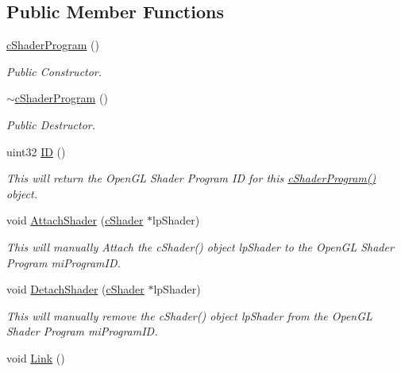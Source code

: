 \subsection*{Public Member Functions}
\begin{DoxyCompactItemize}
\item 
\hyperlink{classc_shader_program_ab032906ae85885362543784fea60cc87}{cShaderProgram} ()
\begin{DoxyCompactList}\small\item\em Public Constructor. \item\end{DoxyCompactList}\item 
\hyperlink{classc_shader_program_acc07aad8793b71f3bbd389bb56ff2415}{$\sim$cShaderProgram} ()
\begin{DoxyCompactList}\small\item\em Public Destructor. \item\end{DoxyCompactList}\item 
uint32 \hyperlink{classc_shader_program_a1affe56cbdde65835335cc1aeb21a851}{ID} ()
\begin{DoxyCompactList}\small\item\em This will return the OpenGL Shader Program ID for this \hyperlink{classc_shader_program_ab032906ae85885362543784fea60cc87}{cShaderProgram()} object. \item\end{DoxyCompactList}\item 
void \hyperlink{classc_shader_program_a0f0adf11f436c0d8149b6c5e196fe859}{AttachShader} (\hyperlink{classc_shader}{cShader} $\ast$lpShader)
\begin{DoxyCompactList}\small\item\em This will manually Attach the cShader() object lpShader to the OpenGL Shader Program miProgramID. \item\end{DoxyCompactList}\item 
void \hyperlink{classc_shader_program_af9df3e552dd368f2a17bc2cd9629c94b}{DetachShader} (\hyperlink{classc_shader}{cShader} $\ast$lpShader)
\begin{DoxyCompactList}\small\item\em This will manually remove the cShader() object lpShader from the OpenGL Shader Program miProgramID. \item\end{DoxyCompactList}\item 
void \hyperlink{classc_shader_program_a2e6bc46c158959bcea66b4e321416b72}{Link} ()

\end{DoxyCompactItemize}

